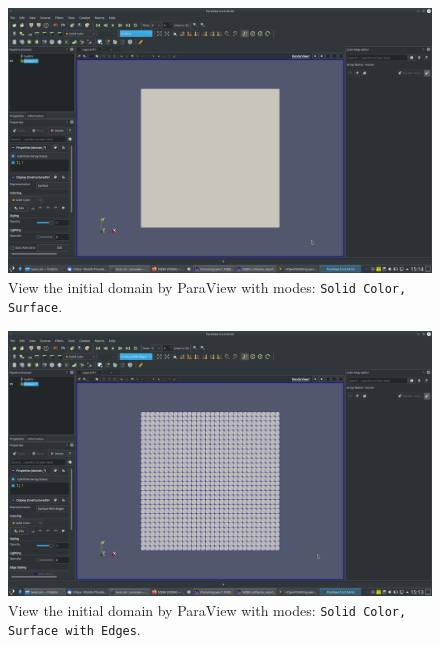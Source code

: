\documentclass[onsided]{book}
\numberwithin{equation}{section}
\begin{document}
\begin{enumerate}
\begin{enumerate}
        \begin{figure}[H]
            \centering
            \includegraphics[height=0.44\textheight]{level_set_initial_domain_Solid_Color_Surface}
            \caption{View the initial domain by ParaView with modes: \texttt{Solid Color, Surface}.}
        \end{figure}
    
        \begin{figure}[H]
            \centering
            \includegraphics[height=0.44\textheight]{level_set_initial_domain_Solid_Color_Surface_with_Edges}
            \caption{View the initial domain by ParaView with modes: \texttt{Solid Color, Surface with Edges}.}
        \end{figure}
    

\end{enumerate}
\end{enumerate}
\end{document}
